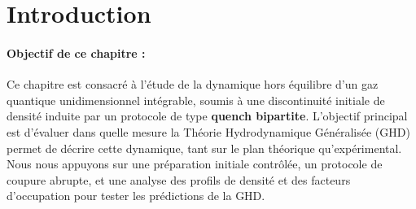 %
%
%
%
\section*{Introduction}


\paragraph{Objectif de ce chapitre :}
Ce chapitre est consacré à l’étude de la dynamique hors équilibre d’un gaz quantique unidimensionnel intégrable, soumis à une discontinuité initiale de densité induite par un protocole de type {\bf quench bipartite}. L’objectif principal est d’évaluer dans quelle mesure la Théorie Hydrodynamique Généralisée (GHD) permet de décrire cette dynamique, tant sur le plan théorique qu’expérimental. Nous nous appuyons sur une préparation initiale contrôlée, un protocole de coupure abrupte, et une analyse des profils de densité et des facteurs d’occupation pour tester les prédictions de la GHD.

